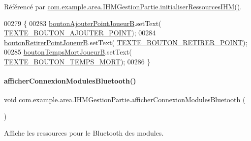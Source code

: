 Référencé par \hyperlink{_i_h_m_gestion_partie_8java_source_l00223}{com.\+example.\+area.\+I\+H\+M\+Gestion\+Partie.\+initialiser\+Ressources\+I\+H\+M()}.


\begin{DoxyCode}
00279     \{
00283         \hyperlink{classcom_1_1example_1_1area_1_1_i_h_m_gestion_partie_a8381630a907132144271c11cba2dce20}{boutonAjouterPointJoueurB}.setText(
      \hyperlink{classcom_1_1example_1_1area_1_1_i_h_m_gestion_partie_a29eb33d17f8f318937bd01705f5769d8}{TEXTE\_BOUTON\_AJOUTER\_POINT});
00284         \hyperlink{classcom_1_1example_1_1area_1_1_i_h_m_gestion_partie_a198ecded9484cec42303eb70246bd590}{boutonRetirerPointJoueurB}.setText(
      \hyperlink{classcom_1_1example_1_1area_1_1_i_h_m_gestion_partie_a9218ba4464b7631738927d74539ac927}{TEXTE\_BOUTON\_RETIRER\_POINT});
00285         \hyperlink{classcom_1_1example_1_1area_1_1_i_h_m_gestion_partie_a35331b85b4b0acc71a4ede7c78819bc0}{boutonTempsMortJoueurB}.setText(
      \hyperlink{classcom_1_1example_1_1area_1_1_i_h_m_gestion_partie_abc36e82bb3c4a2fb719305ea9e525c9b}{TEXTE\_BOUTON\_TEMPS\_MORT});
00286     \}
\end{DoxyCode}
\mbox{\label{classcom_1_1example_1_1area_1_1_i_h_m_gestion_partie_ade4de81cd6978057a06e16e2e577180c}} 
\paragraph{\texorpdfstring{afficher\+Connexion\+Modules\+Bluetooth()}{afficherConnexionModulesBluetooth()}}
{\footnotesize\ttfamily void com.\+example.\+area.\+I\+H\+M\+Gestion\+Partie.\+afficher\+Connexion\+Modules\+Bluetooth (\begin{DoxyParamCaption}{ }\end{DoxyParamCaption})\hspace{0.3cm}{\ttfamily [private]}}



Affiche les ressources pour le Bluetooth des modules. 



